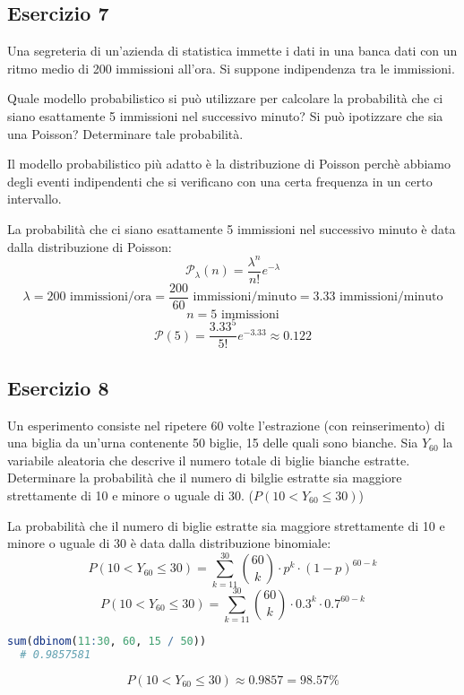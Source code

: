 \documentclass[a4paper]{article}
\theoremstyle{break}
\theoremstyle{break}
\theoremstyle{break}
\theoremstyle{break}
\begin{document}
\subsection{Esercizio 7}
Una segreteria di un'azienda di statistica immette i dati in una banca dati con un ritmo
medio di 200 immissioni all'ora. Si suppone indipendenza tra le immissioni.

\noindent Quale modello probabilistico si può utilizzare per calcolare la probabilità che
ci siano esattamente 5 immissioni nel successivo minuto? Si può ipotizzare che sia una
Poisson? Determinare tale probabilità.

\vspace{1em}
\noindent Il modello probabilistico più adatto è la distribuzione di Poisson perchè
abbiamo degli eventi indipendenti che si verificano con una certa frequenza in un
certo intervallo.

\noindent La probabilità che ci siano esattamente 5 immissioni nel successivo minuto è
data dalla distribuzione di Poisson:
\[
	\mathcal{P}_{\lambda}(n) = \frac{\lambda^n}{n!}e^{-\lambda}
\]
\[
	\lambda = 200 \text{ immissioni/ora} = \frac{200}{60} \text{ immissioni/minuto} = 3.33 \text{ immissioni/minuto}
\]
\[
	n = 5 \text{ immissioni}
\]
\[
	\mathcal{P}(5) = \frac{3.33^5}{5!}e^{-3.33} \approx 0.122
\]

\subsection{Esercizio 8}
Un esperimento consiste nel ripetere 60 volte l'estrazione (con reinserimento) di una
biglia da un'urna contenente 50 biglie, 15 delle quali sono bianche. Sia \( Y_{60} \) la
variabile aleatoria che descrive il numero totale di biglie bianche estratte. Determinare
la probabilità che il numero di bilglie estratte sia maggiore strettamente di 10 e minore
o uguale di 30. (\( P(10 < Y_{60} \le 30) \))

\vspace{1em}
\noindent La probabilità che il numero di biglie estratte sia maggiore strettamente di 10 e
minore o uguale di 30 è data dalla distribuzione binomiale:
\[
	P(10 < Y_{60} \le 30) = \sum_{k=11}^{30} \binom{60}{k} \cdot p^k \cdot (1-p)^{60-k}
\]
\[
	P(10 < Y_{60} \le 30) = \sum_{k=11}^{30} \binom{60}{k} \cdot 0.3^k \cdot 0.7^{60-k}
\]
\begin{lstlisting}[language=R]
  sum(dbinom(11:30, 60, 15 / 50))
  # 0.9857581
\end{lstlisting}
\[
	P(10 < Y_{60} \le 30) \approx 0.9857 = 98.57\%
\]
\end{document}
